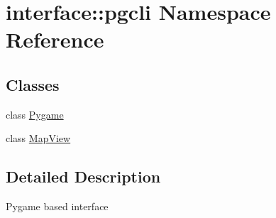\hypertarget{namespaceinterface_1_1pgcli}{\section{interface\-:\-:pgcli \-Namespace \-Reference}
\label{namespaceinterface_1_1pgcli}
}
\subsection*{\-Classes}
\begin{DoxyCompactItemize}
\item 
class \hyperlink{classinterface_1_1pgcli_1_1_pygame}{\-Pygame}
\item 
class \hyperlink{classinterface_1_1pgcli_1_1_map_view}{\-Map\-View}
\end{DoxyCompactItemize}


\subsection{\-Detailed \-Description}
\begin{DoxyVerb}
    Pygame based interface
\end{DoxyVerb}
 